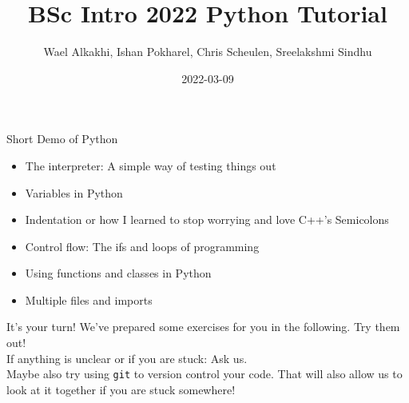 \documentclass[10pt, aspectratio=169]{beamer}
\title{\Large\color{ugoelogodark} BSc Intro 2022 Python Tutorial}
\author[]{Wael Alkakhi, Ishan Pokharel, Chris Scheulen, Sreelakshmi Sindhu}
\institute[Univ. of G\"ottingen]{II.~Physikalisches Institut, Georg-August-Universit\"at G\"ottingen}
\date{2022-03-09}
\begin{document}
\begin{frame}
\titlepage
\end{frame}

\begin{frame}{Short Demo of Python}
  \begin{itemize}
    \item
      The interpreter: A simple way of testing things out
    \item
      Variables in Python
    \item
      Indentation or how I learned to stop worrying and love C++'s Semicolons
    \item
      Control flow: The ifs and loops of programming
    \item
      Using functions and classes in Python
    \item
      Multiple files and imports
  \end{itemize}
  \begin{center}
     It's your turn! We've prepared some exercises for you in the following. Try them out! \\[0.5\baselineskip]
    If anything is unclear or if you are stuck: Ask us. \\[0.5\baselineskip]
    Maybe also try using \texttt{git} to version control your code. That will also allow us to look at it together if you are stuck somewhere!
  \end{center}
\end{frame}
\end{document}
